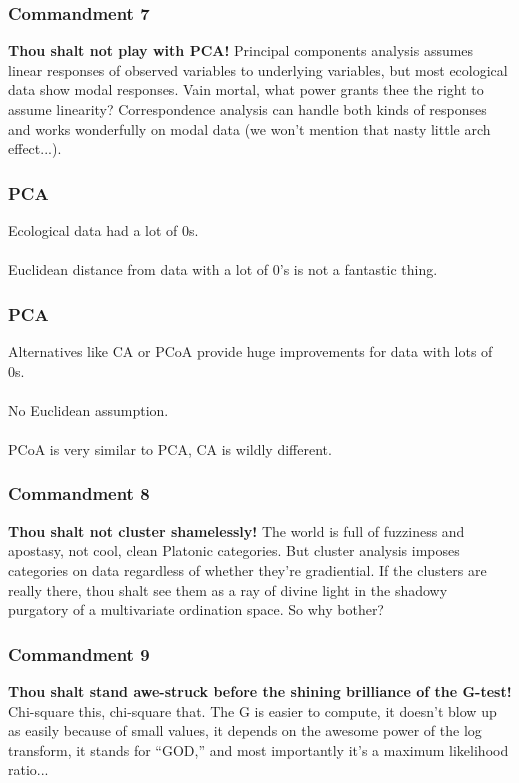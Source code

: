 \documentclass{beamer}
\begin{document}
  \begin{frame}
    \frametitle{Commandment 7}
    \textbf{Thou shalt not play with PCA!} 
    Principal components analysis assumes linear responses of observed variables to underlying variables, but most ecological data show modal responses. 
    Vain mortal, what power grants thee the right to assume linearity? 
    Correspondence analysis can handle both kinds of responses and works wonderfully on modal data (we won't mention that nasty little arch effect...).
  \end{frame}
  
  
  
  \begin{frame}
    \frametitle{PCA}
    Ecological data had a lot of 0s.
    \\~\\
    Euclidean distance from data with a lot of 0's is not a fantastic thing.
    
  \end{frame}
  
  
  
  \begin{frame}
    \frametitle{PCA}
    Alternatives like CA or PCoA provide huge improvements for data with lots of 0s.
    \\~\\
    No Euclidean assumption.
    \\~\\
    PCoA is very similar to PCA, CA is wildly different.
    
  \end{frame}
  
  
  
  \begin{frame}
    \frametitle{Commandment 8}
    \textbf{Thou shalt not cluster shamelessly!} 
    The world is full of fuzziness and apostasy, not cool, clean Platonic categories. 
    But cluster analysis imposes categories on data regardless of whether they're gradiential. 
    If the clusters are really there, thou shalt see them as a ray of divine light in the shadowy purgatory of a multivariate ordination space. 
    So why bother?
  \end{frame}
  
  
  
  \begin{frame}
    \frametitle{Commandment 9}
    \textbf{Thou shalt stand awe-struck before the shining brilliance of the G-test!} 
    Chi-square this, chi-square that. 
    The G is easier to compute, it doesn't blow up as easily because of small values, it depends on the awesome power of the log transform, it stands for ``GOD,'' and most importantly it's a maximum likelihood ratio...
  \end{frame}
  
\end{document}
